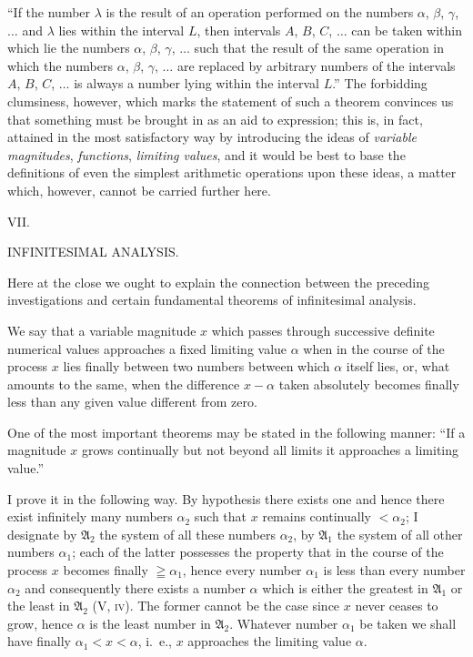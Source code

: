\documentclass[oneside]{book}
\makeatletter
\newcommand\mysect[3]{
\medskip\begin{center}{\large #2.}\end{center}
\begin{center}\uppercase{#3.}\end{center}
\addcontentsline{toc}{section}{\protect\phantom{#1}#2\@. #3}
}
\makeatother
\begin{document}
``If the number $\lambda$ is the result of an operation performed
on the numbers $\alpha$, $\beta$, $\gamma$, $\ldots$ and $\lambda$ lies within
the interval $L$, then intervals $A$, $B$, $C$, $\ldots$ can be
taken within which lie the numbers $\alpha$, $\beta$, $\gamma$, $\ldots$ such
that the result of the same operation in which the
numbers $\alpha$, $\beta$, $\gamma$, $\ldots$ are replaced by arbitrary numbers
of the intervals $A$, $B$, $C$, $\ldots$ is always a number
lying within the interval $L$.'' The forbidding clumsiness,
however, which marks the statement of such a
theorem convinces us that something must be brought
in as an aid to expression; this is, in fact, attained in
the most satisfactory way by introducing the ideas of
\textit{variable magnitudes}, \textit{functions}, \textit{limiting values}, and it
would be best to base the definitions of even the simplest
arithmetic operations upon these ideas, a matter
which, however, cannot be carried further here.

\newpage

\mysect{XI}{VII}{Infinitesimal Analysis}

Here at the close we ought to explain the connection
between the preceding investigations and certain
fundamental theorems of infinitesimal analysis.

We say that a variable magnitude $x$ which passes
through successive definite numerical values approaches
a fixed limiting value $\alpha$ when in the course
of the process $x$ lies finally between two numbers between
which $\alpha$ itself lies, or, what amounts to the
same, when the difference $x-\alpha$ taken absolutely becomes
finally less than any given value different from
zero.

One of the most important theorems may be stated
in the following manner: ``If a magnitude $x$ grows
continually but not beyond all limits it approaches a
limiting value.''

I prove it in the following way. By hypothesis
there exists one and hence there exist infinitely many
numbers $\alpha_2$ such that $x$ remains continually $<\alpha_2$; I
designate by $\mathfrak{A}_2$ the system of all these numbers $\alpha_2$,
by $\mathfrak{A}_1$ the system of all other numbers $\alpha_1$; each of the
latter possesses the property that in the course of the
process $x$ becomes finally $\geqq \alpha_1$, hence every number $\alpha_1$
is less than every number $\alpha_2$ and consequently there
exists a number $\alpha$ which is either the greatest in $\mathfrak{A}_1$
or the least in $\mathfrak{A}_2$ (V, \textsc{iv}). The former cannot be the
case since $x$ never ceases to grow, hence $\alpha$ is the least
number in $\mathfrak{A}_2$. Whatever number $\alpha_1$ be taken we shall
have finally $\alpha_1<x<\alpha$, i.~e., $x$ approaches the limiting
value $\alpha$.
\end{document}
